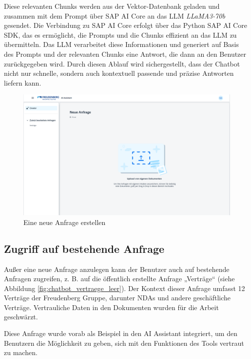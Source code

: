 Diese relevanten Chunks werden aus der Vektor-Datenbank geladen und zusammen mit dem Prompt über SAP AI Core an das \ac{LLM} \textit{LLaMA3-70b} gesendet. 
Die Verbindung zu SAP AI Core erfolgt über das Python SAP AI Core \ac{SDK}, das es ermöglicht, die Prompts und die Chunks effizient an das \ac{LLM} zu übermitteln. 
Das \ac{LLM} verarbeitet diese Informationen und generiert auf Basis des Prompts und der relevanten Chunks eine Antwort, die dann an den Benutzer zurückgegeben wird. 
Durch diesen Ablauf wird sichergestellt, dass der Chatbot nicht nur schnelle, sondern auch kontextuell passende und präzise Antworten liefern kann.


\begin{figure}[H]
    \centering
    \includegraphics[width=1\textwidth]{img/Chatbot_neue_Anfrage.png}
    \caption{Eine neue Anfrage erstellen}
    \label{fig:neue_anfrage}
\end{figure}

\subsection{Zugriff auf bestehende Anfrage}

Außer eine neue Anfrage anzulegen kann der Benutzer auch auf bestehende Anfragen zugreifen, z. B. auf die öffentlich erstellte Anfrage „Verträge“ (siehe Abbildung \ref{fig:chatbot_vertraege_leer}). 
Der Kontext dieser Anfrage umfasst 12 Verträge der Freudenberg Gruppe, darunter \acp{NDA} und andere geschäftliche Verträge. Vertrauliche Daten in den Dokumenten wurden für die Arbeit geschwärzt. 

Diese Anfrage wurde vorab als Beispiel in den AI Assistant integriert, um den Benutzern die Möglichkeit zu geben, sich mit den Funktionen des Tools vertraut zu machen. 

